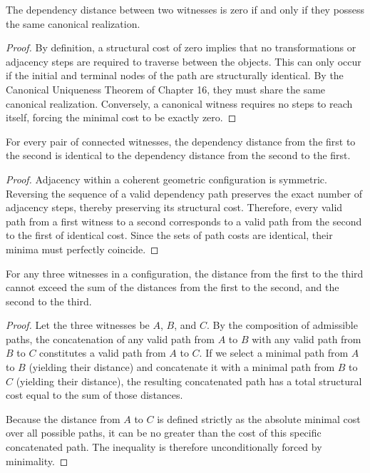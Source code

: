 \documentclass[12pt,anyside]{book}
\begin{document}
\begin{theorem}
The dependency distance between two witnesses is zero if and only if they possess the same canonical realization.
\end{theorem}

\begin{proof}
By definition, a structural cost of zero implies that no transformations or adjacency steps are required to traverse between the objects. This can only occur if the initial and terminal nodes of the path are structurally identical. By the Canonical Uniqueness Theorem of Chapter 16, they must share the same canonical realization. Conversely, a canonical witness requires no steps to reach itself, forcing the minimal cost to be exactly zero.
\end{proof}

\begin{theorem}
For every pair of connected witnesses, the dependency distance from the first to the second is identical to the dependency distance from the second to the first.
\end{theorem}

\begin{proof}
Adjacency within a coherent geometric configuration is symmetric. Reversing the sequence of a valid dependency path preserves the exact number of adjacency steps, thereby preserving its structural cost. Therefore, every valid path from a first witness to a second corresponds to a valid path from the second to the first of identical cost. Since the sets of path costs are identical, their minima must perfectly coincide.
\end{proof}

\begin{theorem}
For any three witnesses in a configuration, the distance from the first to the third cannot exceed the sum of the distances from the first to the second, and the second to the third.
\end{theorem}

\begin{proof}
Let the three witnesses be $A$, $B$, and $C$. By the composition of admissible paths, the concatenation of any valid path from $A$ to $B$ with any valid path from $B$ to $C$ constitutes a valid path from $A$ to $C$. If we select a minimal path from $A$ to $B$ (yielding their distance) and concatenate it with a minimal path from $B$ to $C$ (yielding their distance), the resulting concatenated path has a total structural cost equal to the sum of those distances. 

Because the distance from $A$ to $C$ is defined strictly as the absolute minimal cost over all possible paths, it can be no greater than the cost of this specific concatenated path. The inequality is therefore unconditionally forced by minimality.
\end{proof}
\end{document}
